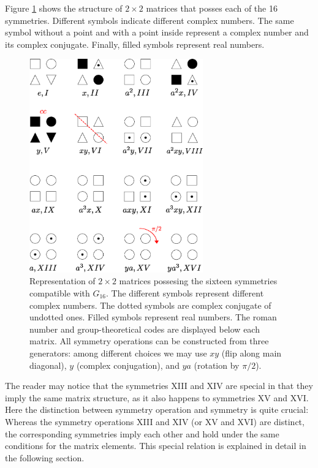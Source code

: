 {%
Figure \ref{fig16} shows the structure of $2\times2$ matrices that posses each of the 16 symmetries. Different symbols indicate different complex numbers. The same symbol without a point and with a point inside represent a complex number and its complex conjugate.
Finally, filled symbols represent real numbers.
\begin{figure}[ht]
\begin{center}
\includegraphics[width=75mm]{Figures/symmetries.eps}
\caption{Representation of $2\times2$ matrices  possesing the  sixteen symmetries compatible with $G_{16}$. The different symbols represent
different complex numbers. The dotted symbols are complex conjugate of undotted ones.  Filled symbols represent real
numbers. The roman number and group-theoretical codes are displayed below each matrix. All symmetry operations
can be constructed from three generators:  among different choices we may use $xy$ (flip along main diagonal), $y$ (complex conjugation), and $ya$ (rotation by $\pi/2$).}
\label{fig16}
\end{center}
\end{figure}


The reader may notice that the symmetries XIII and XIV are special in that they imply the same matrix structure,
as it also happens to
symmetries XV and XVI.
Here the distinction between symmetry operation and symmetry is quite crucial: Whereas
the symmetry operations XIII and XIV (or XV and XVI) are distinct, the corresponding symmetries
imply each other and hold under the same conditions for the matrix elements.  This special relation is explained in detail in the following section.

}
